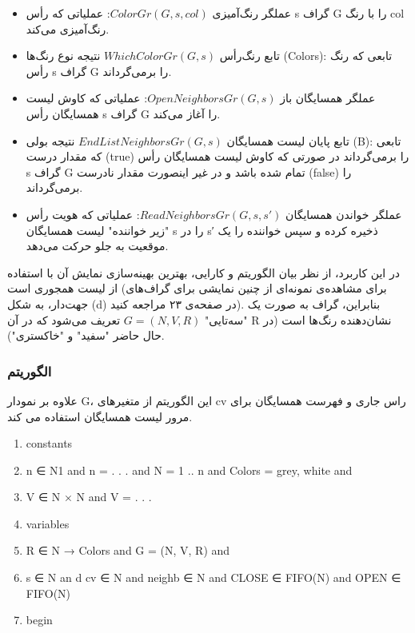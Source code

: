 \documentclass{book} %
\begin{document}
\begin{itemize}
    \item عملگر رنگ‌آمیزی‌ $ColorGr(G, s, col)$: عملیاتی که رأس s گراف G را با رنگ col رنگ‌آمیزی می‌کند.
   
    \item تابع رنگ‌رأس‌ $WhichColorGr(G, s)$ نتیجه نوع رنگ‌ها (Colors): تابعی که رنگ رأس s گراف G را برمی‌گرداند.
   
    \item عملگر همسایگان باز $OpenNeighborsGr(G, s)$: عملیاتی که کاوش لیست همسایگان رأس s گراف G را آغاز می‌کند.
   
    \item تابع پایان لیست همسایگان‌ $EndListNeighborsGr(G, s)$ نتیجه بولی (B): تابعی که مقدار درست (true) را برمی‌گرداند در صورتی که کاوش لیست همسایگان رأس s گراف G تمام شده باشد و در غیر اینصورت مقدار نادرست (false) را برمی‌گرداند.
   
    \item عملگر خواندن همسایگان‌ $ReadNeighborsGr(G, s, s′)$: عملیاتی که هویت رأس "زیر خواننده" لیست همسایگان s را در s′ ذخیره کرده و سپس خواننده را یک موقعیت به جلو حرکت می‌دهد.

\end{itemize}

در این کاربرد، از نظر بیان الگوریتم و کارایی، بهترین بهینه‌سازی نمایش آن با استفاده از لیست همجوری است (برای مشاهده‌ی نمونه‌ای از چنین نمایشی برای گراف‌های جهت‌دار، به شکل (d) در صفحه‌ی ۲۳ مراجعه کنید). بنابراین، گراف به صورت یک "سه‌تایی" $G = (N, V, R)$ تعریف می‌شود که در آن R نشان‌دهنده رنگ‌ها است (در حال حاضر "سفید" و "خاکستری").

\subsubsection*{الگوریتم}

علاوه بر نمودار G، این الگوریتم از متغیرهای cv راس جاری و فهرست همسایگان برای مرور لیست همسایگان استفاده می کند.

\begin{latin}
    
    \begin{enumerate}
        
        \item constants
        \item n ∈ N1 and n = . . . and N = 1 .. n and Colors = {grey, white} and
        \item V ∈ N × N and V = {. . .}
        \item variables
        \item R ∈ N → Colors and G = (N, V, R) and
        \item s ∈ N an d cv ∈ N and neighb ∈ N and CLOSE ∈ FIFO(N) and OPEN ∈ FIFO(N)
        \item begin
        
        
    \end{enumerate}
    
\end{latin}
\end{document}
